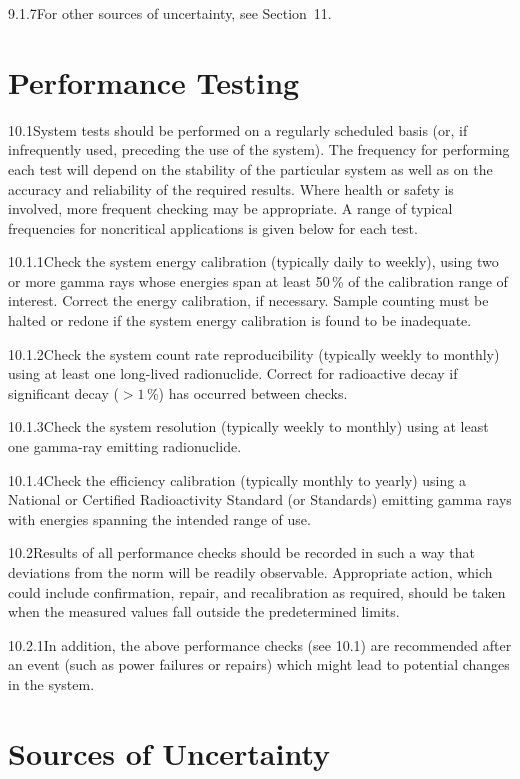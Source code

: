 \documentclass[12pt]{article}
\begin{document}
9.1.7\quad For other sources of uncertainty, see Section~11.

\section{Performance Testing}

10.1\quad System tests should be performed on a regularly scheduled basis (or, if
infrequently used, preceding the use of the system). The frequency for performing each
test will depend on the stability of the particular system as well as on the accuracy and
reliability of the required results. Where health or safety is involved, more frequent
checking may be appropriate. A range of typical frequencies for noncritical applications
is given below for each test.

10.1.1\quad Check the system energy calibration (typically daily to weekly), using two or
more gamma rays whose energies span at least 50\,\% of the calibration range of interest.
Correct the energy calibration, if necessary. Sample counting must be halted or redone if
the system energy calibration is found to be inadequate.

10.1.2\quad Check the system count rate reproducibility (typically weekly to monthly)
using at least one long-lived radionuclide. Correct for radioactive decay if significant
decay ($>1$\,\%) has occurred between checks.

10.1.3\quad Check the system resolution (typically weekly to monthly) using at least one
gamma-ray emitting radionuclide.

10.1.4\quad Check the efficiency calibration (typically monthly to yearly) using a
National or Certified Radioactivity Standard (or Standards) emitting gamma rays with
energies spanning the intended range of use.

10.2\quad Results of all performance checks should be recorded in such a way that
deviations from the norm will be readily observable. Appropriate action, which could
include confirmation, repair, and recalibration as required, should be taken when the
measured values fall outside the predetermined limits.

10.2.1\quad In addition, the above performance checks (see 10.1) are recommended after an
event (such as power failures or repairs) which might lead to potential changes in the
system.

\section{Sources of Uncertainty}
\end{document}
